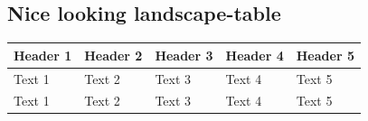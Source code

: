 \documentclass{article}
\begin{document}
\subsection{Nice looking landscape-table}
\begin{landscape}
\begin{longtable}{@{\extracolsep{\fill}}lllll@{}}
\toprule
\textbf{Header 1} & \textbf{Header 2} & \textbf{Header 3} & \textbf{Header 4} & \textbf{Header 5} \\* \midrule
\endfirsthead
%
\endhead
%
Text 1            & Text 2            & Text 3            & Text 4            & Text 5            \\
Text 1            & Text 2            & Text 3            & Text 4            & Text 5            \\* \bottomrule
\end{longtable}
\end{landscape}
\end{document}
